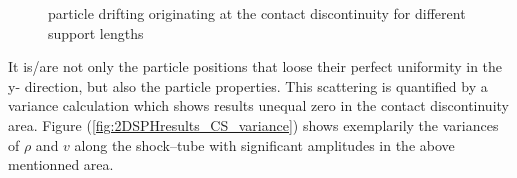 \documentclass{report}
\begin{document}
\begin{figure}[!htbp]
\centering
\label{fig:2DSPHresults_CS_drifting}

\caption[particle drifting for 2D distribution]{particle drifting originating at the contact discontinuity for different support lengths}

\end{figure}

It is/are not only the particle positions that loose their perfect uniformity in the y- direction, but also the particle properties. This scattering is quantified by a variance calculation which shows results unequal zero in the contact discontinuity area.
Figure (\ref{fig:2DSPHresults_CS_variance}) shows exemplarily the variances of $\rho$ and $v$ along the shock--tube with significant amplitudes in the above mentionned area.
\end{document}
